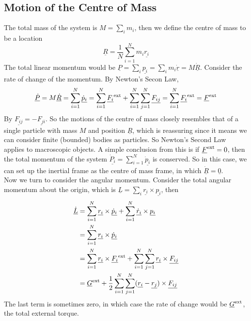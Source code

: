 \subsection{Motion of the Centre of Mass}
The total mass of the system is $M=\sum_im_i$, then we define the centre of mass to be a location
$$\underline{R}=\frac{1}{N}\sum_{i=1}^Nm_i\underline{r_i}$$
The total linear momentum would be $\underline{P}=\sum_i\underline{p_i}=\sum_im_i\underline{\dot{r}}=M\underline{\dot{R}}$.
Consider the rate of change of the momentum.
By Newton's Secon Law,
$$\underline{\dot{P}}=M\underline{\dot{R}}=\sum_{i=1}^N\underline{\dot{p}_i}=\sum_{i=1}^N\underline{F_i}^{\rm ext}+\sum_{i=1}^N\sum_{j=1}^N\underline{F_{ij}}=\sum_{i=1}^N\underline{F_i}^{\rm ext}=\underline{F}^{\rm ext}$$
By $\underline{F_{ij}}=-\underline{F_{ji}}$.
So the motions of the centre of mass closely resembles that of a single particle with mass $M$ and position $\underline{R}$, which is reassuring since it means we can consider finite (bounded) bodies as particles.
So Newton's Second Law applies to macroscopic objects.
A simple conclusion from this is if $\underline{F}^{\rm ext}=0$, then the total momentum of the system $\underline{\dot{P}_i}=\sum_{i=1}^N\underline{\dot{p}_i}$ is conserved.
So in this case, we can set up the inertial frame as the centre of mass frame, in which $\underline{\dot{R}}=\underline{0}$.\\
Now we turn to consider the angular momentum.
Consider the total angular momentum about the origin, which is $\underline{L}=\sum_i\underline{r_i}\times\underline{p_i}$, then
\begin{align*}
    \underline{\dot{L}}&=\sum_{i=1}^N\underline{r_i}\times\underline{\dot{p}_i}+\sum_{i=1}^N\underline{\dot{r}_i}\times\underline{p_i}\\
    &=\sum_{i=1}^N\underline{r_i}\times\underline{\dot{p}_i}\\
    &=\sum_{i=1}^N\underline{r_i}\times\underline{F_i}^{\rm ext}+\sum_{i=1}^N\sum_{j=1}^N\underline{r_i}\times\underline{F_{ij}}\\
    &=\underline{G}^{\rm ext}+\frac{1}{2}\sum_{i=1}^N\sum_{j=1}^N(\underline{r_i}-\underline{r_j})\times\underline{F_{ij}}
\end{align*}
The last term is sometimes zero, in which case the rate of change would be $\underline{G}^{\rm ext}$, the total external torque.
